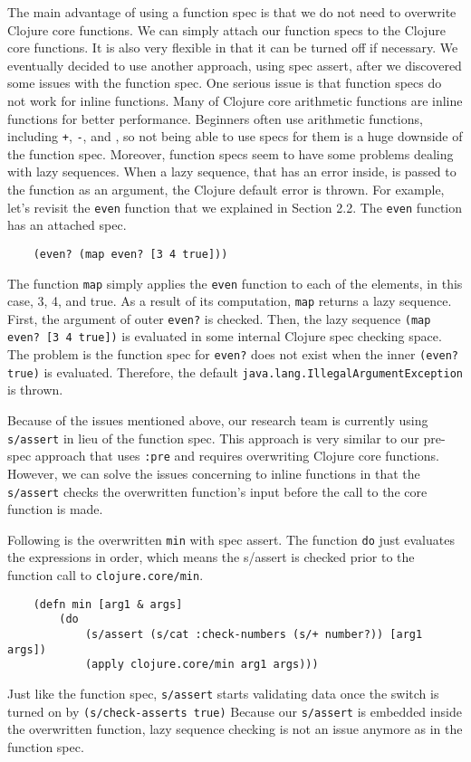 \documentclass[12pt]{article}
\begin{document}
	The main advantage of using a function spec is that we do not need to overwrite Clojure core functions. We can simply attach our 
	function specs to the Clojure core functions. It is also very flexible in that it can be turned off if necessary. 
	We eventually decided to use another approach, using spec assert, after we 
	discovered some issues with the function spec. One serious issue is that function specs do not work for inline functions. 
	Many of Clojure core arithmetic functions are inline functions for better performance. 
	Beginners often use arithmetic functions, including {\tt +}, {\tt -}, and {\tt *}, 
	so not being able to use specs for them is a huge downside of the function spec. 
	Moreover, function specs seem to have some problems dealing with lazy sequences. When a lazy sequence, 
	that has an error inside, is passed to the function as an argument, the Clojure default error is thrown. 
	For example, let's revisit the {\tt even} function that we explained in Section 2.2. 
	The {\tt even} function has an attached spec.
	\begin{verbatim}
	(even? (map even? [3 4 true]))
	\end{verbatim}
	The function {\tt map} simply applies the {\tt even} function to each of the elements, in this case, 3, 4, and true.
	As a result of its computation, {\tt map} returns a lazy sequence.
	First, the argument of outer {\tt even?} is checked. Then, the lazy sequence {\tt (map even? [3 4 true])} is
	evaluated in some internal Clojure spec checking space. The problem is the function spec for {\tt even?} does not exist
	when the inner {\tt (even? true)} is evaluated. Therefore, the default {\tt java.lang.IllegalArgumentException} is thrown.

	Because of the issues mentioned above, our research team is currently using {\tt s/assert} in lieu of the function spec.
	This approach is very similar to our pre-spec approach that uses {\tt :pre} and requires overwriting 
	Clojure core functions. However, we can solve the issues concerning to inline functions in that 
	the {\tt s/assert} checks the overwritten function's input before the call to the core function is made. 
	
	Following is the overwritten {\tt min} with spec assert. The function {\tt do} just evaluates
	the expressions in order, which means the s/assert is checked prior to the function call to {\tt clojure.core/min}.
	\begin{verbatim}
	(defn min [arg1 & args]
  		(do 
    		(s/assert (s/cat :check-numbers (s/+ number?)) [arg1 args])
    		(apply clojure.core/min arg1 args)))
	\end{verbatim} 
	Just like the function spec, {\tt s/assert} starts validating data once the switch is turned on by {\tt (s/check-asserts true)}
	Because our {\tt s/assert} is embedded inside the overwritten function, lazy sequence checking is not
	an issue anymore as in the function spec.
	
\end{document}
